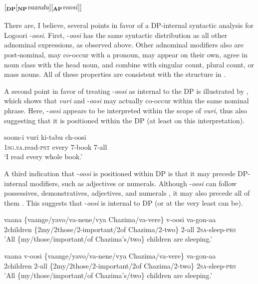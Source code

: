 \documentclass[output=paper]{langsci/langscibook}
\begin{document}
\subsection{$\mathbf{[_{DP} [_{ NP} {\text{\textit{vaandu}}}] [_{AP} {\text{\textit{voosi}}}]]}$}

There are, I believe, several points in favor of a DP-internal syntactic analysis for Logoori -\textit{oosi}. First, -\textit{oosi} has the same syntactic distribution as all other adnominal expressions, as observed above. Other adnominal modifiers also are post-nominal, may co-occur with a pronoun, may appear on their own, agree in noun class with the head noun, and combine with singular count, plural count, or mass nouns. All of these properties are consistent with the structure in . 

A second point in favor of treating -\textit{oosi} as internal to the DP is illustrated by , which shows that \textit{vuri} and -\textit{oosi} may actually co-occur within the same nominal phrase. Here, -\textit{oosi} appears to be interpreted within the scope of \textit{vuri}, thus also suggesting that it is positioned within the DP (at least on this interpretation).

\ea
\gll soom-i      vuri    ki-tabu  ch-oosi\\
     1\textsc{sg.sa}.read-\textsc{pst}  every    7-book  7-all \\
\glt ‘I read every whole book.’
\z

A third indication that -\textit{oosi} is positioned within DP is that it may precede DP-internal modifiers, such as adjectives or numerals. Although -\textit{oosi} can follow possessives, demonstratives, adjectives, and numerals , it may also precede all of them . This suggests that -\textit{oosi} is internal to DP (or at the very least can be). 

\ea 
\gll vaana  \textup{\{}vaange\textup{/}yavo\textup{/}va-nene/vya Chazima/va-vere\}  v-oosi  va-gon-aa\\
     2children  \{2my/2those/2-important/2of Chazima/2-two\}  2-all  2\textsc{sa}-sleep-\textsc{prs}\\
\glt 'All \{my/those/important/of Chazima's/two\} children are sleeping.'  
\z

\ea
\gll vaana  v-oosi\textup{   \{}vaange\textup{/}yavo\textup{/}va-nene/vya Chazima/va-vere\}  va-gon-aa\\
     2children  2-all   \{2my/2those/2-important/2of Chazima/2-two\}  2\textsc{sa}-sleep-\textsc{prs}\\
     'All \{my/those/important/of Chazima's/two\} children are sleeping.'  \\
\z
\end{document}
